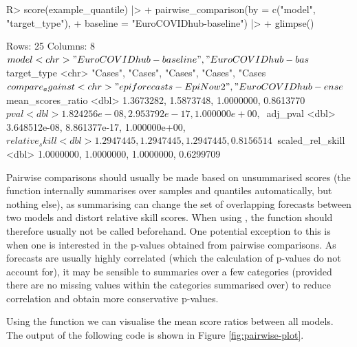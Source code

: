 \documentclass[
]{jss}
\begin{document}
\begin{CodeChunk}
\begin{CodeInput}
R> score(example_quantile) |>
+   pairwise_comparison(by = c("model", "target_type"), 
+                       baseline = "EuroCOVIDhub-baseline") |>
+   glimpse()
\end{CodeInput}
\begin{CodeOutput}
Rows: 25
Columns: 8
$ model             <chr> "EuroCOVIDhub-baseline", "EuroCOVIDhub-bas~
$ target_type       <chr> "Cases", "Cases", "Cases", "Cases", "Cases~
$ compare_against   <chr> "epiforecasts-EpiNow2", "EuroCOVIDhub-ense~
$ mean_scores_ratio <dbl> 1.3673282, 1.5873748, 1.0000000, 0.8613770~
$ pval              <dbl> 1.824256e-08, 2.953792e-17, 1.000000e+00, ~
$ adj_pval          <dbl> 3.648512e-08, 8.861377e-17, 1.000000e+00, ~
$ relative_skill    <dbl> 1.2947445, 1.2947445, 1.2947445, 0.8156514~
$ scaled_rel_skill  <dbl> 1.0000000, 1.0000000, 1.0000000, 0.6299709~
\end{CodeOutput}
\end{CodeChunk}

Pairwise comparisons should usually be made based on unsummarised scores
(the function  internally summarises over
samples and quantiles automatically, but nothing else), as summarising
can change the set of overlapping forecasts between two models and
distort relative skill scores. When using ,
the function  should therefore usually not be
called beforehand. One potential exception to this is when one is
interested in the p-values obtained from pairwise comparisons. As
forecasts are usually highly correlated (which the calculation of
p-values do not account for), it may be sensible to summaries over a few
categories (provided there are no missing values within the categories
summarised over) to reduce correlation and obtain more conservative
p-values.

Using the function  we can visualise
the mean score ratios between all models. The output of the following
code is shown in Figure \ref{fig:pairwise-plot}.
\end{document}

